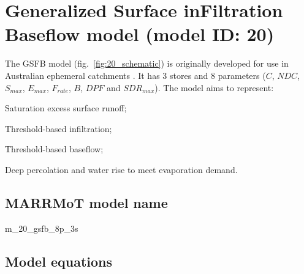\section{Generalized Surface inFiltration Baseflow model (model ID: 20)}
The GSFB model (fig.~\ref{fig:20_schematic}) is  originally developed for use in Australian ephemeral catchments \citep{Nathan1990,Ye1997}. It has 3 stores and 8 parameters ($C$, $NDC$, $S_{max}$, $E_{max}$, $F_{rate}$, $B$, $DPF$ and $SDR_{max}$). The model aims to represent:

\begin{itemizecompact}
\item Saturation excess surface runoff;
\item Threshold-based infiltration;
\item Threshold-based baseflow;
\item Deep percolation and water rise to meet evaporation demand.
\end{itemizecompact}

\subsection{MARRMoT model name}
m\_20\_gsfb\_8p\_3s \\

\subsection{Model equations}

